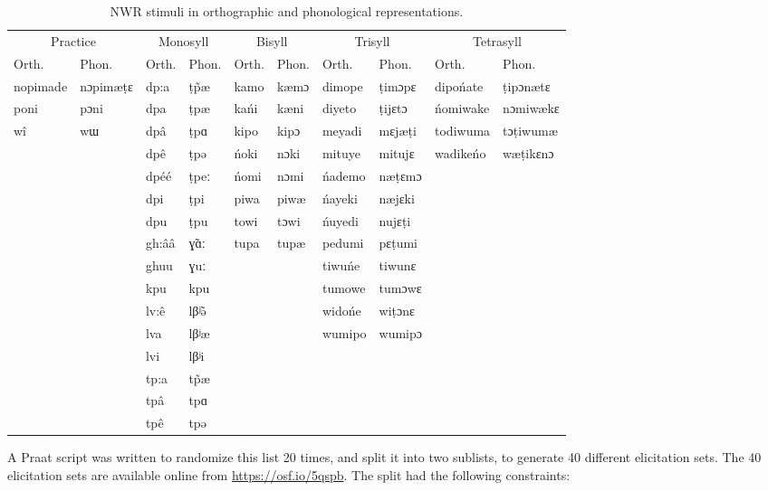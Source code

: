 \documentclass[english,,man,floatsintext]{apa6}
\begin{document}
\begin{table}

\caption{\label{tab:tab2-stims}NWR stimuli in orthographic and phonological representations.}
\centering
\begin{tabular}[t]{llllllllll}
\toprule
\multicolumn{2}{c}{Practice} & \multicolumn{2}{c}{Monosyll} & \multicolumn{2}{c}{Bisyll} & \multicolumn{2}{c}{Trisyll} & \multicolumn{2}{c}{Tetrasyll} \\
\cmidrule(l{3pt}r{3pt}){1-2} \cmidrule(l{3pt}r{3pt}){3-4} \cmidrule(l{3pt}r{3pt}){5-6} \cmidrule(l{3pt}r{3pt}){7-8} \cmidrule(l{3pt}r{3pt}){9-10}
Orth. & Phon. & Orth. & Phon. & Orth. & Phon. & Orth. & Phon. & Orth. & Phon.\\
\midrule
nopimade & nɔpimæṭɛ & dp:a & ṭp̃æ & kamo & kæmɔ & dimope & ṭimɔpɛ & dipońate & ṭipɔnætɛ\\
poni & pɔni & dpa & ṭpæ & kańi & kæni & diyeto & ṭijɛtɔ & ńomiwake & nɔmiwækɛ\\
wî & wɯ & dpâ & ṭpɑ & kipo & kipɔ & meyadi & mɛjæṭi & todiwuma & tɔṭiwumæ\\
 &  & dpê & ṭpə & ńoki & nɔki & mituye & mitujɛ & wadikeńo & wæṭikɛnɔ\\
 &  & dpéé & ṭpeː & ńomi & nɔmi & ńademo & næṭɛmɔ &  & \\
\addlinespace
 &  & dpi & ṭpi & piwa & piwæ & ńayeki & næjɛki &  & \\
 &  & dpu & ṭpu & towi & tɔwi & ńuyedi & nujɛṭi &  & \\
 &  & gh:ââ & ɣ̃ɑː & tupa & tupæ & pedumi & pɛṭumi &  & \\
 &  & ghuu & ɣuː &  &  & tiwuńe & tiwunɛ &  & \\
 &  & kpu & kpu &  &  & tumowe & tumɔwɛ &  & \\
\addlinespace
 &  & lv:ê & lβʲ̃ə &  &  & widońe & wiṭɔnɛ &  & \\
 &  & lva & lβʲæ &  &  & wumipo & wumipɔ &  & \\
 &  & lvi & lβʲi &  &  &  &  &  & \\
 &  & tp:a & tp̃æ &  &  &  &  &  & \\
 &  & tpâ & tpɑ &  &  &  &  &  & \\
\addlinespace
 &  & tpê & tpə &  &  &  &  &  & \\
\bottomrule
\end{tabular}
\end{table}

A Praat script was written to randomize this list 20 times, and split it into two sublists, to generate 40 different elicitation sets. The 40 elicitation sets are available online from \url{https://osf.io/5qspb}. The split had the following constraints:
\end{document}
